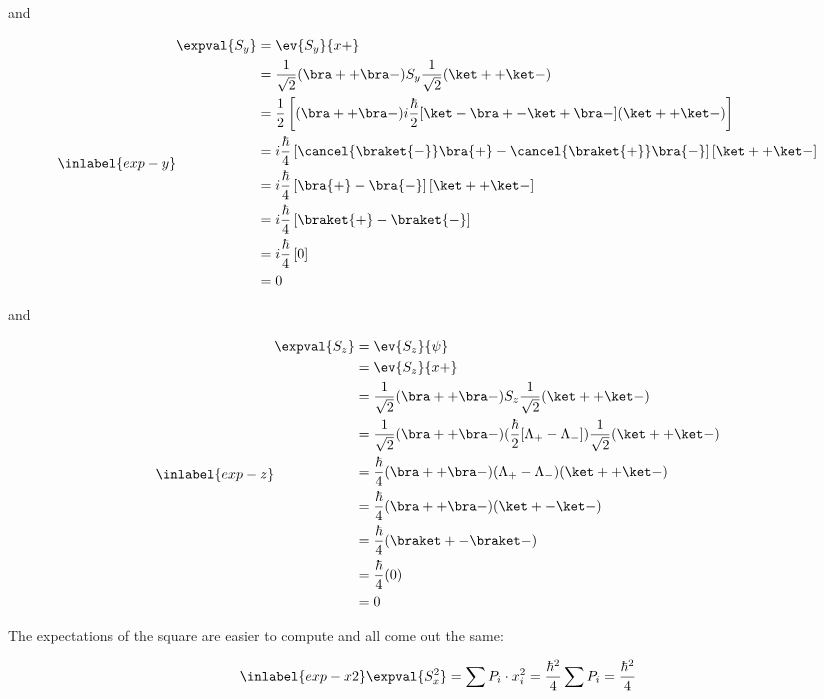 \begin{answer}
and

\begin{equation}
  \inlabel{exp-y}
  \begin{split}
    \expval{S_y} &= \ev{S_y}{x+}\\
    &= \frac{1}{\sqrt{2}}(\bra + + \bra -) S_y \frac{1}{\sqrt{2}}(\ket + + \ket -)\\
    &= \frac{1}{2} \left[ (\bra + + \bra -)
      i \frac{\hbar}{2} [\ket - \bra + - \ket + \bra - ]
      (\ket + + \ket -)
      \right]\\
    &= i \frac{\hbar}{4} \left[ \cancel{\braket{-}}\bra{+} - \cancel{\braket{+}}\bra{-} \right]\left[ \ket + + \ket - \right]\\
    &= i \frac{\hbar}{4} \left[ \bra{+} - \bra{-} \right]\left[ \ket + + \ket - \right]\\
    &= i \frac{\hbar}{4} \left[ \braket{+} - \braket{-} \right]\\
    &= i \frac{\hbar}{4} \left[ 0 \right]\\
    &= 0\\
  \end{split}
\end{equation}

and

\begin{equation}
  \inlabel{exp-z}
  \begin{split}
    \expval{S_z} &= \ev{S_z}{\psi}\\
    &= \ev{S_z}{x+}\\
    &= \frac{1}{\sqrt{2}}(\bra + + \bra -) S_z \frac{1}{\sqrt{2}}(\ket + + \ket -)\\
    &= \frac{1}{\sqrt{2}}(\bra + + \bra -) (\frac{\hbar}{2} [\Lambda_+ - \Lambda_-]) \frac{1}{\sqrt{2}}(\ket + + \ket -)\\
    &= \frac{\hbar}{4}(\bra + + \bra -)(\Lambda_+ - \Lambda_-)(\ket + + \ket -)\\
    &= \frac{\hbar}{4}(\bra + + \bra -)(\ket + - \ket -)\\
    &= \frac{\hbar}{4}(\braket + - \braket -)\\
    &= \frac{\hbar}{4}(0)\\
    &= 0\\
  \end{split}
\end{equation}


The expectations of the square are easier to compute and all come out
the same:

\begin{equation}
  \inlabel{exp-x2}
  \expval{S_x^2} = \sum{P_i \cdot x_i^2} = \frac{\hbar^2}{4} \sum{P_i} =
  \frac{\hbar^2}{4}
\end{equation}


\end{answer}

